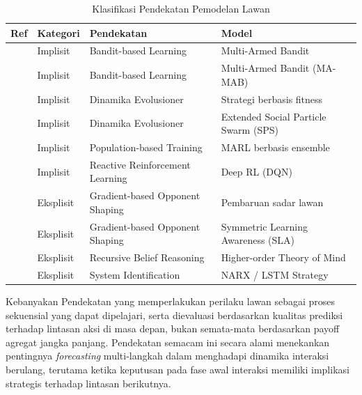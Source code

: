\begin{table}[ht]
\centering
\caption{Klasifikasi Pendekatan Pemodelan Lawan}
\label{tab:klasifikasi_pemodelan_lawan}
\begin{tabular}{p{2cm} p{2.0cm} p{4cm} p{4cm}}
\toprule
\textbf{Ref} & \textbf{Kategori} & \textbf{Pendekatan} & \textbf{Model} \\
\midrule

\cite{wang_achieving_2019} 
& Implisit 
& Bandit-based Learning 
& Multi-Armed Bandit \\

\cite{gomez_grounded_2025} 
& Implisit 
& Bandit-based Learning 
& Multi-Armed Bandit (MA-MAB) \\

\cite{zhu_evolutionary_2025} 
& Implisit 
& Dinamika Evolusioner 
& Strategi berbasis fitness \\

\cite{elhamer_effects_2020} 
& Implisit 
& Dinamika Evolusioner 
& Extended Social Particle Swarm (SPS) \\

\cite{perera_learning_2025} 
& Implisit 
& Population-based Training 
& MARL berbasis ensemble \\

\cite{wang_achieving_2019} 
& Implisit 
& Reactive Reinforcement Learning 
& Deep RL (DQN) \\

\cite{lv_inducing_2023} 
& Eksplisit 
& Gradient-based Opponent Shaping 
& Pembaruan sadar lawan \\

\cite{hu_modeling_2023} 
& Eksplisit 
& Gradient-based Opponent Shaping 
& Symmetric Learning Awareness (SLA) \\

\cite{de_weerd_higher-order_2022} 
& Eksplisit 
& Recursive Belief Reasoning 
& Higher-order Theory of Mind \\

\cite{li_exploiting_2025} 
& Eksplisit 
& System Identification 
& NARX / LSTM Strategy \\

\bottomrule
\end{tabular}
\end{table}

Kebanyakan Pendekatan yang memperlakukan perilaku lawan sebagai proses sekuensial yang dapat 
dipelajari, serta dievaluasi berdasarkan 
kualitas prediksi terhadap lintasan aksi di masa depan, bukan semata-mata 
berdasarkan payoff agregat jangka panjang. Pendekatan semacam ini secara 
alami menekankan pentingnya \textit{forecasting} multi-langkah dalam 
menghadapi dinamika interaksi berulang, terutama ketika keputusan pada 
fase awal interaksi memiliki implikasi strategis terhadap lintasan berikutnya.

